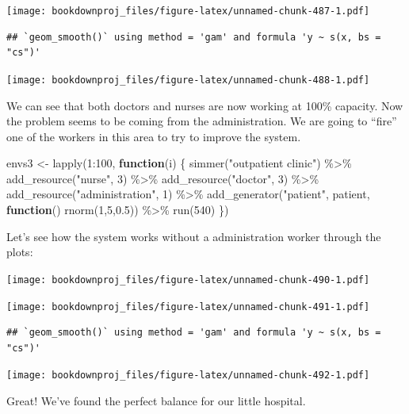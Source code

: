 \documentclass[
]{book}
\newenvironment{Shaded}{\begin{snugshade}}{\end{snugshade}}
\newcommand{\ControlFlowTok}[1]{\textcolor[rgb]{0.13,0.29,0.53}{\textbf{#1}}}
\newcommand{\DecValTok}[1]{\textcolor[rgb]{0.00,0.00,0.81}{#1}}
\newcommand{\FloatTok}[1]{\textcolor[rgb]{0.00,0.00,0.81}{#1}}
\newcommand{\FunctionTok}[1]{\textcolor[rgb]{0.00,0.00,0.00}{#1}}
\newcommand{\NormalTok}[1]{#1}
\newcommand{\OtherTok}[1]{\textcolor[rgb]{0.56,0.35,0.01}{#1}}
\newcommand{\SpecialCharTok}[1]{\textcolor[rgb]{0.00,0.00,0.00}{#1}}
\newcommand{\StringTok}[1]{\textcolor[rgb]{0.31,0.60,0.02}{#1}}
\begin{document}
\texttt{[image: bookdownproj\_files/figure-latex/unnamed-chunk-487-1.pdf]}

\begin{verbatim}
## `geom_smooth()` using method = 'gam' and formula 'y ~ s(x, bs = "cs")'
\end{verbatim}

\texttt{[image: bookdownproj\_files/figure-latex/unnamed-chunk-488-1.pdf]}

We can see that both doctors and nurses are now working at 100\% capacity. Now the problem seems to be coming from the administration. We are going to ``fire'' one of the workers in this area to try to improve the system.

\begin{Shaded}
\begin{Highlighting}[]
\NormalTok{envs3 }\OtherTok{\textless{}{-}} \FunctionTok{lapply}\NormalTok{(}\DecValTok{1}\SpecialCharTok{:}\DecValTok{100}\NormalTok{, }\ControlFlowTok{function}\NormalTok{(i) \{}
  \FunctionTok{simmer}\NormalTok{(}\StringTok{"outpatient clinic"}\NormalTok{) }\SpecialCharTok{\%\textgreater{}\%}
    \FunctionTok{add\_resource}\NormalTok{(}\StringTok{"nurse"}\NormalTok{, }\DecValTok{3}\NormalTok{) }\SpecialCharTok{\%\textgreater{}\%}
    \FunctionTok{add\_resource}\NormalTok{(}\StringTok{"doctor"}\NormalTok{, }\DecValTok{3}\NormalTok{) }\SpecialCharTok{\%\textgreater{}\%}
    \FunctionTok{add\_resource}\NormalTok{(}\StringTok{"administration"}\NormalTok{, }\DecValTok{1}\NormalTok{) }\SpecialCharTok{\%\textgreater{}\%}
    \FunctionTok{add\_generator}\NormalTok{(}\StringTok{"patient"}\NormalTok{, patient, }\ControlFlowTok{function}\NormalTok{() }\FunctionTok{rnorm}\NormalTok{(}\DecValTok{1}\NormalTok{,}\DecValTok{5}\NormalTok{,}\FloatTok{0.5}\NormalTok{)) }\SpecialCharTok{\%\textgreater{}\%}
    \FunctionTok{run}\NormalTok{(}\DecValTok{540}\NormalTok{)}
\NormalTok{\})}
\end{Highlighting}
\end{Shaded}

Let's see how the system works without a administration worker through the plots:

\texttt{[image: bookdownproj\_files/figure-latex/unnamed-chunk-490-1.pdf]}

\texttt{[image: bookdownproj\_files/figure-latex/unnamed-chunk-491-1.pdf]}

\begin{verbatim}
## `geom_smooth()` using method = 'gam' and formula 'y ~ s(x, bs = "cs")'
\end{verbatim}

\texttt{[image: bookdownproj\_files/figure-latex/unnamed-chunk-492-1.pdf]}

Great! We've found the perfect balance for our little hospital.

  
\end{document}
